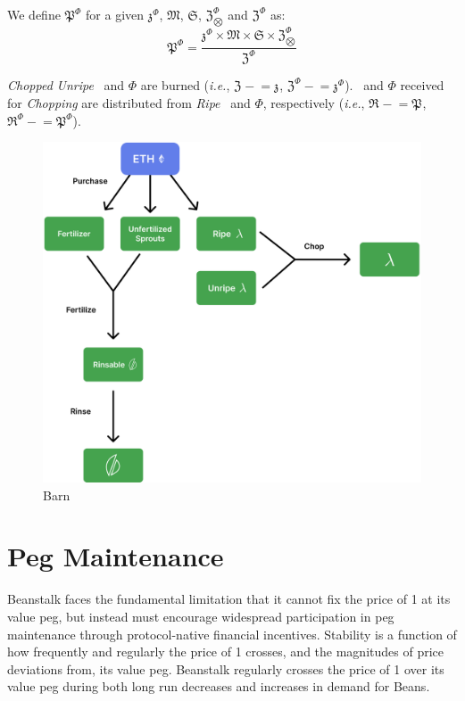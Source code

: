 \documentclass[tikz]{article}
\newcommand{\term}[1]{\textsl{#1}}
\newcommand{\Bean}{} %
\newcommand{\bean}{} %
\begin{document}
We define $\mathfrak{P}^{\Phi}$ for a given $\mathfrak{z}^{\Phi}$, $\mathfrak{M}$, $\mathfrak{S}$, $\mathfrak{Z}_{\bigotimes}^{\Phi}$ and $\mathfrak{Z}^{\Phi}$ as:
$$\mathfrak{P}^{\Phi} = \frac{\mathfrak{z}^{\Phi} \times \mathfrak{M} \times \mathfrak{S} \times \mathfrak{Z}_{\bigotimes}^{\Phi}}{\mathfrak{Z}^{\Phi}}$$

\term{Chopped} \term{Unripe} \Bean\ and $\Phi$ are burned (\term{i.e.}, $\mathfrak{Z}^{\bean} \mathrel{-}= \mathfrak{z}^{\bean}$, $\mathfrak{Z}^{\Phi} \mathrel{-}= \mathfrak{z}^{\Phi}$). \Bean\ and $\Phi$ received for \term{Chopping} are distributed from \term{Ripe} \Bean\ and $\Phi$, respectively (\term{i.e.}, $\mathfrak{R}^{\bean} \mathrel{-}= \mathfrak{P}^{\bean}$, $\mathfrak{R}^{\Phi} \mathrel{-}= \mathfrak{P}^{\Phi}$).

\begin{figure}[h!]
    \centering
    \includegraphics[scale=.155]{Figure3} %
    \vspace*{-5mm}
    \caption{Barn}
    \label{fig 3}
\end{figure}

\section{Peg Maintenance}
Beanstalk faces the fundamental limitation that it cannot fix the price of \Bean1 at its value peg, but instead must encourage widespread participation in peg maintenance through protocol-native financial incentives. Stability is a function of how frequently and regularly the price of \Bean1 crosses, and the magnitudes of price deviations from, its value peg. Beanstalk regularly crosses the price of \Bean1 over its value peg during both long run decreases and increases in demand for Beans.
\end{document}
